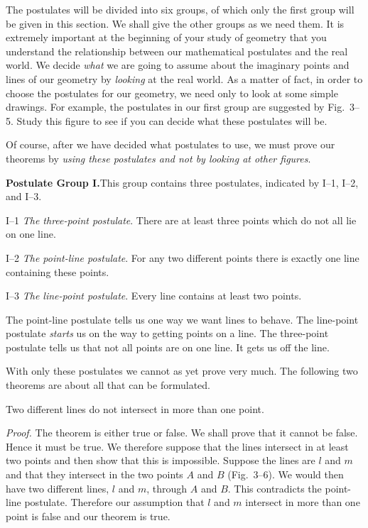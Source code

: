 \documentclass[11pt]{book}
\theoremstyle{bkplain}
\begin{document}
The postulates will be divided into six groups, of which only the first group
will be given in this section. We shall give the other groups as we need them.
It is extremely important at the beginning of your study of geometry that you
understand the relationship between our mathematical postulates and the real
world. We decide \emph{what} we are going to assume about the imaginary points
and lines of our geometry by \emph{looking} at the real world. As a matter of
fact, in order to choose the postulates for our geometry, we need only to look at
some simple drawings. For example, the postulates in our first group are
suggested by Fig.~3--5. Study this figure to see if you can decide what these
postulates will be.

Of course, after we have decided what postulates to use, we must prove our
theorems by \emph{using these postulates and not by looking at other figures}.

\medskip
\noindent\textbf{Postulate Group I.}\quad This group contains three postulates,
indicated by I--1, I--2, and I--3.

\medskip
\noindent I--1 \emph{The three-point postulate}. There are at least three points
which do not all lie on one line.

\medskip
\noindent I--2 \emph{The point-line postulate}. For any two different points
there is exactly one line containing these points.

\medskip
\noindent I--3 \emph{The line-point postulate}. Every line contains at least two
points.

\medskip
The point-line postulate tells us one way we want lines to behave. The
line-point postulate \emph{starts} us on the way to getting points on a line. The
three-point postulate tells us that not all points are on one line. It gets us
off the line.

With only these postulates we cannot as yet prove very much. The following two
theorems are about all that can be formulated.

\begin{theorem}
Two different lines do not intersect in more than one point.
\end{theorem}

\noindent\emph{Proof.} The theorem is either true or false. We shall prove that
it cannot be false. Hence it must be true. We therefore suppose that the lines
intersect in at least two points and then show that this is impossible. Suppose
the lines are $l$ and $m$ and that they intersect in the two points $A$ and $B$
(Fig.~3--6). We would then have two different lines, $l$ and $m$, through $A$ and
$B$. This contradicts the point-line postulate. Therefore our assumption that
$l$ and $m$ intersect in more than one point is false and our theorem is true.
\end{document}

